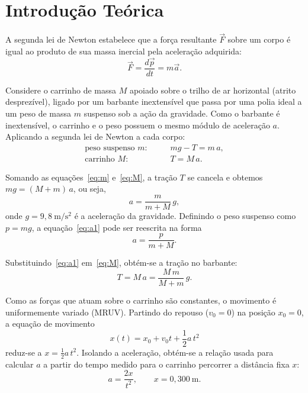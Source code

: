\documentclass[12pt,a4paper]{article}
\begin{document}
\section{Introdução Teórica}
A segunda lei de Newton estabelece que a força resultante $\vec{F}$ sobre um corpo é igual ao
produto de sua massa inercial pela aceleração adquirida:
\begin{equation}
\label{eq:2lei}
\vec{F} = \frac{d \vec{p}}{dt} = m\vec{a}.
\end{equation}

Considere o carrinho de massa $M$ apoiado sobre o trilho de ar horizontal (atrito desprezível),
ligado por um barbante inextensível que passa por uma polia ideal a um peso de massa $m$ suspenso
sob a ação da gravidade. Como o barbante é inextensível, o carrinho e o peso possuem o mesmo
módulo de aceleração $a$. Aplicando a segunda lei de Newton a cada corpo:
\begin{align}
\text{peso suspenso $m$:}\qquad & mg - T = m\,a, \label{eq:m}\\
\text{carrinho $M$:}\qquad & T = M\,a. \label{eq:M}
\end{align}

Somando as equações~\eqref{eq:m} e~\eqref{eq:M}, a tração $T$ se cancela e obtemos
$mg = (M+m)\,a$, ou seja,
\begin{equation}
\label{eq:a1}
a = \frac{m}{m+M}\,g,
\end{equation}
onde $g = 9{,}8~\mathrm{m/s^2}$ é a aceleração da gravidade. Definindo o peso suspenso como
$p = mg$, a equação~\eqref{eq:a1} pode ser reescrita na forma
\begin{equation}
\label{eq:a2}
a = \frac{p}{m+M}.
\end{equation}

Substituindo~\eqref{eq:a1} em~\eqref{eq:M}, obtém-se a tração no barbante:
\begin{equation}
\label{eq:T}
T = M\,a = \frac{M\,m}{M+m}\,g.
\end{equation}

Como as forças que atuam sobre o carrinho são constantes, o movimento é uniformemente variado
(MRUV). Partindo do repouso ($v_0 = 0$) na posição $x_0 = 0$, a equação de movimento
\begin{equation}
\label{eq:mruv}
x(t) = x_0 + v_0 t + \frac{1}{2}a\,t^2
\end{equation}
reduz-se a $x = \tfrac{1}{2}a\,t^2$. Isolando a aceleração, obtém-se a relação usada para
calcular $a$ a partir do tempo medido para o carrinho percorrer a distância fixa $x$:
\begin{equation}
\label{eq:acalc}
a = \frac{2x}{t^2}, \qquad x = 0{,}300~\mathrm{m}.
\end{equation}
\end{document}

